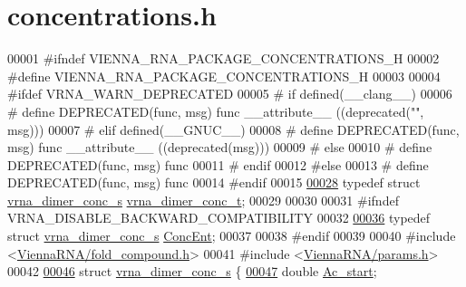 \hypertarget{concentrations_8h_source}{}\section{concentrations.\+h}
\label{concentrations_8h_source}

\begin{DoxyCode}
00001 \textcolor{preprocessor}{#ifndef VIENNA\_RNA\_PACKAGE\_CONCENTRATIONS\_H}
00002 \textcolor{preprocessor}{#define VIENNA\_RNA\_PACKAGE\_CONCENTRATIONS\_H}
00003 
00004 \textcolor{preprocessor}{#ifdef VRNA\_WARN\_DEPRECATED}
00005 \textcolor{preprocessor}{# if defined(\_\_clang\_\_)}
00006 \textcolor{preprocessor}{#  define DEPRECATED(func, msg) func \_\_attribute\_\_ ((deprecated("", msg)))}
00007 \textcolor{preprocessor}{# elif defined(\_\_GNUC\_\_)}
00008 \textcolor{preprocessor}{#  define DEPRECATED(func, msg) func \_\_attribute\_\_ ((deprecated(msg)))}
00009 \textcolor{preprocessor}{# else}
00010 \textcolor{preprocessor}{#  define DEPRECATED(func, msg) func}
00011 \textcolor{preprocessor}{# endif}
00012 \textcolor{preprocessor}{#else}
00013 \textcolor{preprocessor}{# define DEPRECATED(func, msg) func}
00014 \textcolor{preprocessor}{#endif}
00015 
\hyperlink{group__pf__cofold_gac48c2723444ecfdceafcfd525ca98322}{00028} \textcolor{keyword}{typedef} \textcolor{keyword}{struct }\hyperlink{structvrna__dimer__conc__s}{vrna\_dimer\_conc\_s} \hyperlink{structvrna__dimer__conc__s}{vrna\_dimer\_conc\_t};
00029 
00030 
00031 \textcolor{preprocessor}{#ifndef VRNA\_DISABLE\_BACKWARD\_COMPATIBILITY}
00032 
\hyperlink{group__pf__cofold_ga46244c7adf5040580291c45b465f4efa}{00036} \textcolor{keyword}{typedef} \textcolor{keyword}{struct }\hyperlink{structvrna__dimer__conc__s}{vrna\_dimer\_conc\_s} \hyperlink{structvrna__dimer__conc__s}{ConcEnt};
00037 
00038 \textcolor{preprocessor}{#endif}
00039 
00040 \textcolor{preprocessor}{#include <\hyperlink{fold__compound_8h}{ViennaRNA/fold\_compound.h}>}
00041 \textcolor{preprocessor}{#include <\hyperlink{params_8h}{ViennaRNA/params.h}>}
00042 
\hyperlink{structvrna__dimer__conc__s}{00046} \textcolor{keyword}{struct }\hyperlink{structvrna__dimer__conc__s}{vrna\_dimer\_conc\_s} \{
\hyperlink{structvrna__dimer__conc__s_a6e64ce1afbc93756afef06c0e3ccce97}{00047}   \textcolor{keywordtype}{double}  \hyperlink{structvrna__dimer__conc__s_a6e64ce1afbc93756afef06c0e3ccce97}{Ac\_start};   

\end{DoxyCode}
